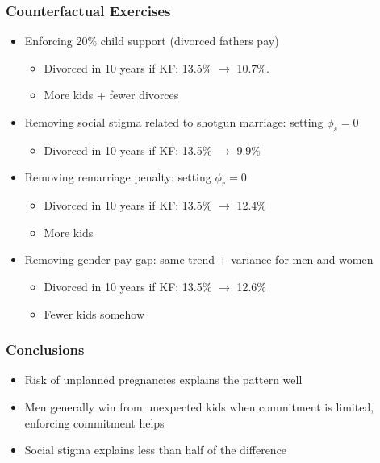\documentclass[aspectratio=169]{beamer}
\let\olditem\item
\renewcommand{\item}{%
\olditem\vspace{\fill}}
\begin{document}
\begin{frame}[label=cf]
\frametitle{Counterfactual Exercises}
\begin{itemize}
\item Enforcing 20\% child support (divorced fathers pay) \hyperlink{child_support}{} 
\begin{itemize}
\item Divorced in 10 years if KF: 13.5\% $\to$ 10.7\%.
\item More kids + fewer divorces
\end{itemize}
\item Removing social stigma related to shotgun marriage: setting $\phi_s = 0$ \hyperlink{noss}{} 
\begin{itemize}
\item Divorced in 10 years if KF: 13.5\% $\to$ 9.9\%
\end{itemize}
\item Removing remarriage penalty: setting $\phi_r = 0$ \hyperlink{remarriage_penalty}{} 
\begin{itemize}
\item Divorced in 10 years if KF: 13.5\% $\to$ 12.4\%
\item More kids
\end{itemize}
\item Removing gender pay gap: same trend + variance for men and women \hyperlink{pay_gap}{} 
\begin{itemize}
\item Divorced in 10 years if KF: 13.5\% $\to$ 12.6\%
\item Fewer kids somehow
\end{itemize}
\end{itemize}
\end{frame}



\begin{frame}[label=cf]
\frametitle{Conclusions}
\begin{itemize}
\item Risk of unplanned pregnancies explains the pattern well
\item Men generally win from unexpected kids when commitment is limited, enforcing commitment helps
\item Social stigma explains less than half of the difference
\end{itemize}
\end{frame}
\end{document}
